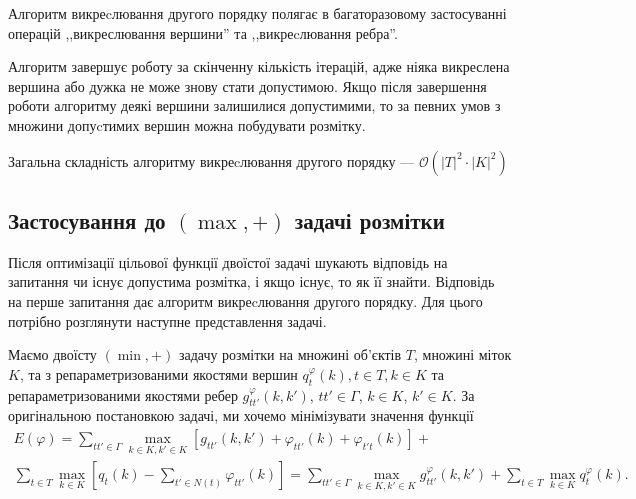 Алгоритм викреcлювання другого порядку полягає в багаторазовому застосуванні
операцій ,,викреслювання вершини'' та ,,викреcлювання ребра''. 

Алгоритм завершує роботу за скінченну кількість ітерацій, 
адже ніяка викреслена вершина або дужка не може
знову стати допустимою. Якщо після завершення роботи алгоритму деякі вершини
залишилися допустимими, то за певних умов \cite{savchynskyy} з множини допуcтимих вершин можна побудувати розмітку.

Загальна складність алгоритму викреcлювання другого порядку --- $\mathcal{O}(|T|^2\cdot |K|^2)$

\subsection{Застосування до $(\max,+)$ задачі розмітки}

Після оптимізації цільової функції двоїстої задачі шукають відповідь на запитання
чи існує допустима розмітка, і якщо існує, то як її знайти. Відповідь на перше
запитання дає алгоритм викреcлювання другого порядку. Для цього потрібно розглянути
наступне представлення задачі.

Маємо двоїсту $(\min, +)$ задачу розмітки на множині об'єктів $T$, множині 
міток $K$, та з репараметризованими якостями вершин 
$q^\varphi_t(k), t\in T, k\in K$ та репараметризованими якостями ребер
$g^\varphi_{tt'}(k,k')$, $tt'\in\Gamma$, $k\in K$, $k'\in K$.
За оригінальною постановкою задачі, ми хочемо мінімізувати значення
функції
\begin{equation}
    \begin{aligned}
    E(\varphi) = \sum\limits_{tt'\in\Gamma}\max\limits_{k\in K, k'\in K}[ g_{tt'}(k,k')
    + \varphi_{tt'}(k) + \varphi_{t't}(k)] +\\
    \sum\limits_{t\in T}\max\limits_{k\in K}[ q_t(k) - \sum\limits_{t'\in N(t)} \varphi_{tt'}(k)] =
    \sum\limits_{tt'\in\Gamma}\max\limits_{k\in K, k'\in K}g^\varphi_{tt'}(k,k') + 
    \sum\limits_{t\in T}\max\limits_{k\in K}q^\varphi_t(k).
\end{aligned}
\end{equation}

